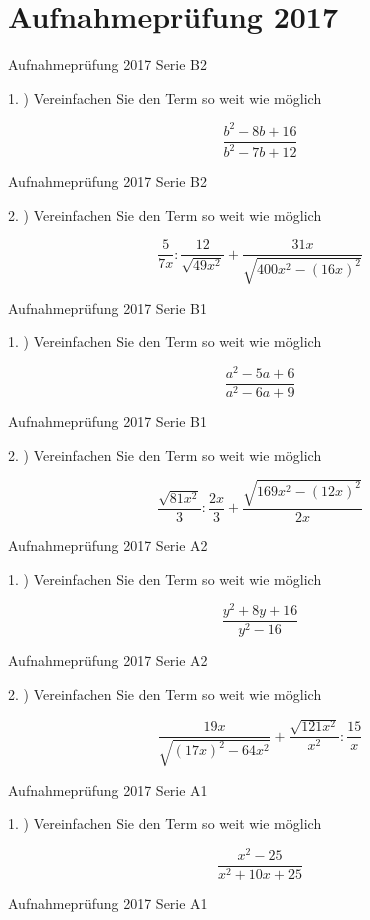 \section*{Aufnahmeprüfung 2017}
Aufnahmeprüfung 2017 Serie B2

1. ) Vereinfachen Sie den Term so weit wie möglich

$$\frac{b^2-8b+16}{b^2-7b+12}$$

Aufnahmeprüfung 2017 Serie B2

2. ) Vereinfachen Sie den Term so weit wie möglich

$$\frac{5}{7x} : \frac{12}{\sqrt{49x^2}} + \frac{31x}{\sqrt{400x^2 - (16x)^2}}$$

Aufnahmeprüfung 2017 Serie B1

1. ) Vereinfachen Sie den Term so weit wie möglich

$$\frac{a^2-5a+6}{a^2-6a+9}$$

Aufnahmeprüfung 2017 Serie B1

2. ) Vereinfachen Sie den Term so weit wie möglich

$$\frac{\sqrt{81x^2}}{3} : \frac{2x}3 + \frac{\sqrt{169x^2 - (12x)^2}}{2x}$$

Aufnahmeprüfung 2017 Serie A2

1. ) Vereinfachen Sie den Term so weit wie möglich

$$\frac{y^2+8y+16}{y^2-16}$$

Aufnahmeprüfung 2017 Serie A2

2. ) Vereinfachen Sie den Term so weit wie möglich

$$\frac{19x}{\sqrt{(17x)^2 - 64x^2}} + \frac{\sqrt{121x^2}}{x^2} : \frac{15}{x}$$

Aufnahmeprüfung 2017 Serie A1

1. ) Vereinfachen Sie den Term so weit wie möglich

$$\frac{x^2-25}{x^2+10x+25}$$

Aufnahmeprüfung 2017 Serie A1

